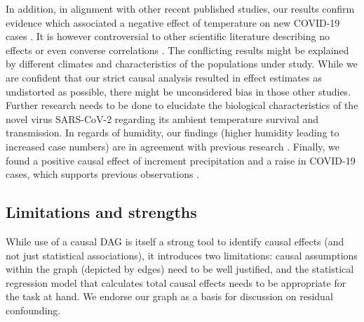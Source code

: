 \documentclass[]{elsarticle} %
\begin{document}
In addition, in alignment with other recent published studies, our
results confirm evidence which associated a negative effect of
temperature on new COVID-19 cases
\citep{bannister-tyrrell_preliminary_2020, demongeot_temperature_2020, liu_impact_2020, qi_covid-19_2020, shi_impact_2020, sobral_association_2020, tosepu_correlation_2020, Wang2020temperature, wu_effects_2020}.
It is however controversial to other scientific literature describing no
effects
\citep{briz-redon_spatio-temporal_2020, iqbal_nexus_2020, jahangiri_sensitivity_2020, juni_impact_2020, yao_no_2020}
or even converse correlations
\citep{auler_evidence_2020, xie_association_2020}. The conflicting
results might be explained by different climates and characteristics of
the populations under study. While we are confident that our strict
causal analysis resulted in effect estimates as undistorted as possible,
there might be unconsidered bias in those other studies. Further
research needs to be done to elucidate the biological characteristics of
the novel virus SARS-CoV-2 regarding its ambient temperature survival
and transmission. In regards of humidity, our findings (higher humidity
leading to increased case numbers) are in agreement with previous
research \citep{qi_covid-19_2020, wu_effects_2020, juni_impact_2020}.
Finally, we found a positive causal effect of increment precipitation
and a raise in COVID-19 cases, which supports previous observations
\citep{sobral_association_2020}.

\subsection{Limitations and strengths}\label{limitations-and-strengths}

While use of a causal DAG is itself a strong tool to identify causal
effects (and not just statistical associations), it introduces two
limitations: causal assumptions within the graph (depicted by edges)
need to be well justified, and the statistical regression model that
calculates total causal effects needs to be appropriate for the task at
hand. We endorse our graph as a basis for discussion on residual
confounding.
\end{document}
